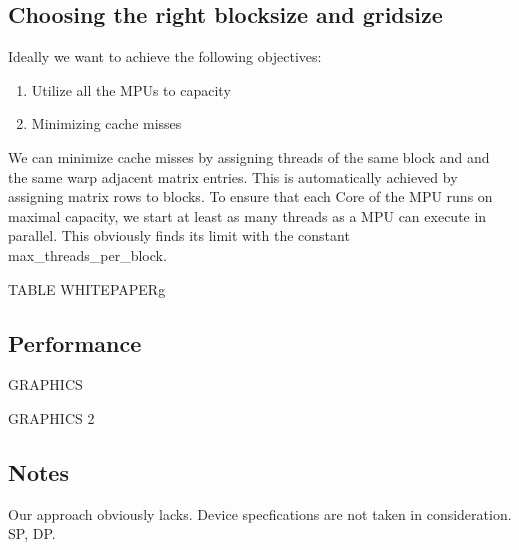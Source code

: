 \subsection{Choosing the right blocksize and gridsize}

Ideally we want to achieve the following objectives:
\begin{enumerate}
	\item Utilize all the MPUs to capacity
	\item Minimizing cache misses
\end{enumerate}

We can minimize cache misses by assigning threads of the same block and and the same warp adjacent matrix entries. This is automatically achieved by assigning matrix rows to blocks.
To ensure that each Core of the MPU runs on maximal capacity, we start at least as many threads as a MPU can execute in parallel. This obviously finds its limit with the constant max\_threads\_per\_block.

\begin{center}
	TABLE WHITEPAPERg
\end{center}

\subsection{Performance}

\begin{center}
	GRAPHICS
\end{center}

\begin{center}
	GRAPHICS 2
\end{center}

\subsection{Notes}
Our approach obviously lacks. Device specfications are not taken in consideration. SP, DP.